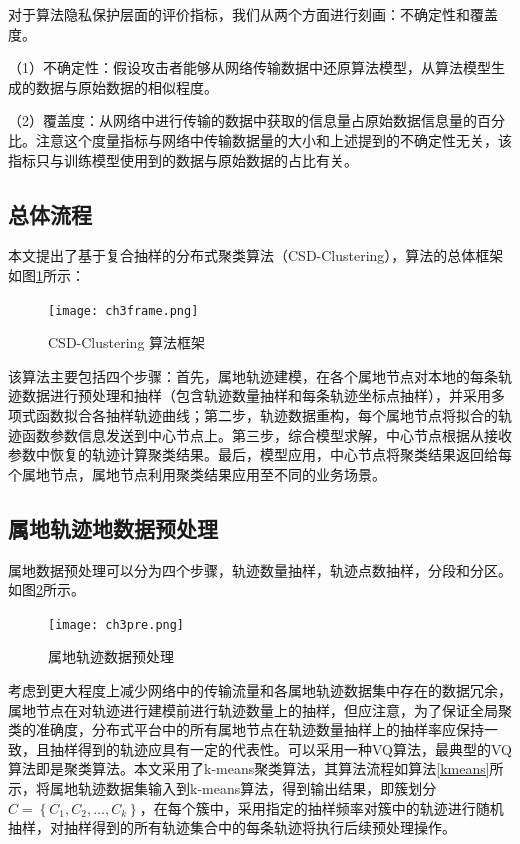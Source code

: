 对于算法隐私保护层面的评价指标，我们从两个方面进行刻画：不确定性和覆盖度。

（1）不确定性：假设攻击者能够从网络传输数据中还原算法模型，从算法模型生成的数据与原始数据的相似程度。

（2）覆盖度：从网络中进行传输的数据中获取的信息量占原始数据信息量的百分比。注意这个度量指标与网络中传输数据量的大小和上述提到的不确定性无关，该指标只与训练模型使用到的数据与原始数据的占比有关。

\subsection{总体流程}

本文提出了基于复合抽样的分布式聚类算法（CSD-Clustering），算法的总体框架如图\ref{ch3frame}所示：
\begin{figure}[h]
	\texttt{[image: ch3frame.png]}
	\caption{CSD-Clustering 算法框架}
	\label{ch3frame}
\end{figure}

该算法主要包括四个步骤：首先，属地轨迹建模，在各个属地节点对本地的每条轨迹数据进行预处理和抽样（包含轨迹数量抽样和每条轨迹坐标点抽样），并采用多项式函数拟合各抽样轨迹曲线；第二步，轨迹数据重构，每个属地节点将拟合的轨迹函数参数信息发送到中心节点上。第三步，综合模型求解，中心节点根据从接收参数中恢复的轨迹计算聚类结果。最后，模型应用，中心节点将聚类结果返回给每个属地节点，属地节点利用聚类结果应用至不同的业务场景。 

\subsection{属地轨迹地数据预处理}

属地数据预处理可以分为四个步骤，轨迹数量抽样，轨迹点数抽样，分段和分区。如图\ref{ch3pre}所示。
\begin{figure}[H]
	\texttt{[image: ch3pre.png]}
	\caption{属地轨迹数据预处理}
	\label{ch3pre}
\end{figure}

考虑到更大程度上减少网络中的传输流量和各属地轨迹数据集中存在的数据冗余，属地节点在对轨迹进行建模前进行轨迹数量上的抽样，但应注意，为了保证全局聚类的准确度，分布式平台中的所有属地节点在轨迹数量抽样上的抽样率应保持一致，且抽样得到的轨迹应具有一定的代表性。可以采用一种VQ算法，最典型的VQ算法即是聚类算法。本文采用了k-means聚类算法，其算法流程如算法\ref{kmeans}所示，将属地轨迹数据集输入到k-means算法，得到输出结果，即簇划分$C=\left\{C_1,C_2,...,C_k\right\}$，在每个簇中，采用指定的抽样频率对簇中的轨迹进行随机抽样，对抽样得到的所有轨迹集合中的每条轨迹将执行后续预处理操作。

